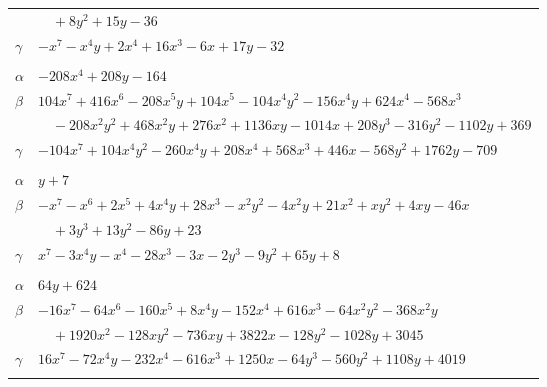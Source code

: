 \documentclass[11pt]{article}
\begin{document}
\begin{longtable}{@{}ll@{}}
 & $\quad +8y^{2}+15y-36$\\
$\gamma$ & $-x^{7}-x^{4}y+2x^{4}+16x^{3}-6x+17y-32$\\
\addlinespace[3pt]
\multicolumn{2}{@{}l}{$\{i,j\}=\{29,35\}$, $k_{ij}=3^{3}\cdot 5$}\\
$\alpha$ & $-208x^{4}+208y-164$\\
$\beta$ & $104x^{7}+416x^{6}-208x^{5}y+104x^{5}-104x^{4}y^{2}-156x^{4}y+624x^{4}-568x^{3}$\\
 & $\quad -208x^{2}y^{2}+468x^{2}y+276x^{2}+1136xy-1014x+208y^{3}-316y^{2}-1102y+369$\\
$\gamma$ & $-104x^{7}+104x^{4}y^{2}-260x^{4}y+208x^{4}+568x^{3}+446x-568y^{2}+1762y-709$\\
\addlinespace[3pt]
\multicolumn{2}{@{}l}{$\{i,j\}=\{31,32\}$, $k_{ij}=2^{4}$}\\
$\alpha$ & $y+7$\\
$\beta$ & $-x^{7}-x^{6}+2x^{5}+4x^{4}y+28x^{3}-x^{2}y^{2}-4x^{2}y+21x^{2}+xy^{2}+4xy-46x$\\
 & $\quad +3y^{3}+13y^{2}-86y+23$\\
$\gamma$ & $x^{7}-3x^{4}y-x^{4}-28x^{3}-3x-2y^{3}-9y^{2}+65y+8$\\
\addlinespace[3pt]
\multicolumn{2}{@{}l}{$\{i,j\}=\{33,36\}$, $k_{ij}=2\cdot 5^{2}\cdot 7$}\\
$\alpha$ & $64y+624$\\
$\beta$ & $-16x^{7}-64x^{6}-160x^{5}+8x^{4}y-152x^{4}+616x^{3}-64x^{2}y^{2}-368x^{2}y$\\
 & $\quad +1920x^{2}-128xy^{2}-736xy+3822x-128y^{2}-1028y+3045$\\
$\gamma$ & $16x^{7}-72x^{4}y-232x^{4}-616x^{3}+1250x-64y^{3}-560y^{2}+1108y+4019$\\
\addlinespace[3pt]
\end{longtable}
\endgroup
\end{document}
